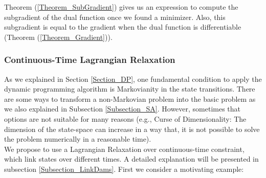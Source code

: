 Theorem (\ref{Theorem_SubGradient}) gives us an expression to compute the subgradient of the dual function once we found a minimizer. Also, this subgradient is equal to the gradient when the dual function is differentiable (Theorem (\ref{Theorem_Gradient})).

\subsubsection{Continuous-Time Lagrangian Relaxation} \label{CTLR}

As we explained in Section \ref{Section_DP}, one fundamental condition to apply 
the dynamic programming algorithm is Markovianity in the state transitions. There 
are some ways to transform a non-Markovian problem into the basic problem as we 
also explained in Subsection \ref{Subsection_SA}. However, sometimes that options 
are not suitable for many reasons (e.g., Curse of Dimensionality: The dimension 
of the state-space can increase in a way that, it is not possible to solve 
the problem numerically in a reasonable time).\\

We propose to use a Lagrangian Relaxation over continuous-time 
constraint, which link states over different times. A detailed explanation will 
be presented in subsection \ref{Subsection_LinkDams}. First we consider 
a motivating example:

